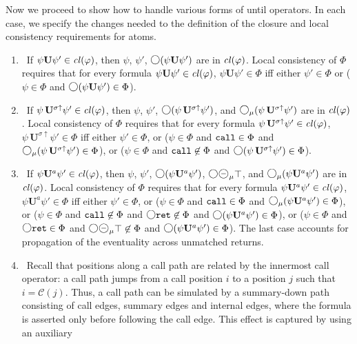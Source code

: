 \documentclass{LMCS}
\newcommand{\M}{{\mu}}
\newcommand{\dm}{\Diamond}
\newcommand{\C}{{\mathcal{C}}}
\newcommand{\U}{{\mathbf U}}
\newcommand{\next}{\text{\raisebox{1pt}{$\bigcirc$}}}
\theoremstyle{plain}
\theoremstyle{definition}
\newcommand{\ppath}{\sigma} \newcommand{\Ul}{\U}
\newcommand{\Ur}{\U^a}
\newcommand{\prev}{{\text{\Large $\mathbf{\circleddash}$}}}
\newcommand{\retr}{\mathit{ret}}
\def\Cl{{\it cl\/}}
\newcommand{\upuntil}{{\,\U^{\ppath\uparrow}}}
\newcommand{\rett}{{\tt ret}}
\newcommand{\call}{{\tt call}}
\renewcommand{\retr}{\rett}
\newcommand{\dmm}{\dm_{\M}}
\newcommand{\dmminus}{\dm^-}
\newcommand{\dmmminus}{\dm_{\M}^-}
\renewcommand{\dm}{\next}
\renewcommand{\dmminus}{\prev}
\renewcommand{\dmm}{\dm_\M}
\renewcommand{\dmmminus}{\dmminus_{\M}}
\begin{document}
Now we proceed to show how to handle various forms of until operators.
In each case, we specify the changes needed to the definition of the closure
and local consistency requirements for atoms. 
\begin{enumerate}
\item{}\
If $\psi \Ul \psi'\in\Cl(\varphi)$, then $\psi$, $\psi'$,
$\next(\psi \Ul \psi')$ are in $\Cl(\varphi)$.
Local consistency of $\Phi$ requires that
for every formula $\psi\Ul \psi'\in \Cl(\varphi)$,
           $\psi \Ul \psi' \in \Phi$ iff
           either $\psi' \in \Phi$ or ($\psi \in \Phi$ and
                      $\next(\psi \Ul \psi') \in \Phi$).
\item{}\
If $\psi \upuntil \psi'\in\Cl(\varphi)$, then $\psi$, $\psi'$,
$\next(\psi \upuntil \psi')$, and $\dmm(\psi \upuntil \psi')$
 are in $\Cl(\varphi)$.
Local consistency of $\Phi$ requires that
for every formula $\psi\upuntil \psi'\in \Cl(\varphi)$,
           $\psi \upuntil \psi' \in \Phi$ iff
           either $\psi' \in \Phi$, or 
           ($\psi \in \Phi$ and $\call\in\Phi$ and $\dmm(\psi \upuntil \psi') \in \Phi$), or
($\psi \in \Phi$ and $\call\not\in\Phi$ and $\next(\psi \upuntil \psi') \in \Phi$).
\item\noindent{\hskip-10 pt\bf Abstract paths:}\
If $\psi \Ur \psi'\in\Cl(\varphi)$, then $\psi$, $\psi'$,
$\next(\psi \Ur \psi')$, $\next\dmmminus\top$, and $\dmm(\psi \Ur \psi')$
 are in $\Cl(\varphi)$.
Local consistency of $\Phi$ requires that
for every formula $\psi\Ur \psi'\in \Cl(\varphi)$,
           $\psi \Ur \psi' \in \Phi$ iff
           either $\psi' \in \Phi$, or 
           ($\psi \in \Phi$ and $\call\in\Phi$ and $\dmm(\psi \Ur \psi') \in \Phi$), or
($\psi \in \Phi$ and $\call\not\in\Phi$ and $\next\retr\not\in\Phi$ and $\next(\psi \Ur \psi') \in \Phi$), 
or ($\psi\in\Phi$ and $\next\retr\in\Phi$ and $\next\dmmminus\top\not\in\Phi$ and
$\next(\psi \Ur \psi') \in \Phi$).
The last case accounts for propagation of the eventuality across unmatched returns.
\item\noindent{\hskip-10 pt\bf Call paths:}\
Recall that positions along a call path are related by the innermost call operator:
a call path jumps from a call position $i$ to a position $j$ such that $i=\C(j)$.
Thus, a call path can be simulated by a summary-down path consisting of
call edges, summary edges and internal edges, where the formula is asserted
only before following the call edge. This effect is captured by using an auxiliary

\end{enumerate}
\end{document}
